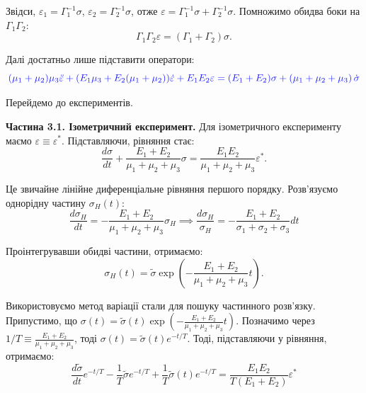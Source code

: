 \documentclass{hw_template}
\begin{document}
Звідси, $\varepsilon_1 = \Gamma_1^{-1}\sigma$, $\varepsilon_2 =
\Gamma_2^{-1}\sigma$, отже $\varepsilon = \Gamma_1^{-1}\sigma +
\Gamma_2^{-1}\sigma$. Помножимо обидва боки на $\Gamma_1\Gamma_2$:
\begin{equation*}
    \Gamma_1\Gamma_2\varepsilon = (\Gamma_1 + \Gamma_2)\sigma.
\end{equation*}

Далі достатньо лише підставити оператори:
\begin{equation*}
    \textcolor{blue!90!white}{(\mu_1+\mu_2)\mu_3\ddot{\varepsilon} + (E_1\mu_3 + E_2(\mu_1+\mu_2))\dot{\varepsilon} + E_1E_2\varepsilon = (E_1 + E_2)\sigma + \left(\mu_1+\mu_2+\mu_3\right)\dot{\sigma}}
\end{equation*}

Перейдемо до експериментів.

\textcolor{blue!90!white}{\textbf{Частина 3.1. Ізометричний експеримент.}} Для 
ізометричного експерименту маємо $\varepsilon \equiv \varepsilon^*$. Підставляючи,
рівняння стає:
\begin{equation*}
    \frac{d\sigma}{dt} + \frac{E_1 + E_2}{\mu_1+\mu_2+\mu_3}\sigma = \frac{E_1E_2}{\mu_1+\mu_2+\mu_3}\varepsilon^*.
\end{equation*}

Це звичайне лінійне диференціальне рівняння першого порядку. Розв'язуємо однорідну 
частину $\sigma_H(t)$:
\begin{equation*}
    \frac{d\sigma_H}{dt} = -\frac{E_1 + E_2}{\mu_1+\mu_2+\mu_3}\sigma _H
    \implies \frac{d\sigma_H}{\sigma_H} = -\frac{E_1 + E_2}{\sigma_1+\sigma_2+\sigma_3}dt
\end{equation*}

Проінтегрувавши обидві частини, отримаємо:
\begin{equation*}
    \sigma_H(t) = \widetilde{\sigma} \exp\left(-\frac{E_1 + E_2}{\mu_1+\mu_2+\mu_3}t\right).
\end{equation*}

Використовуємо метод варіації стали для пошуку частинного розв'язку. Припустимо,
що $\sigma(t) = \widetilde{\sigma}(t)\exp\left(-\frac{E_1 + E_2}{\mu_1+\mu_2+\mu_3}t\right)$.
Позначимо через $1/T \equiv \frac{E_1 + E_2}{\mu_1+\mu_2+\mu_3}$, тоді $\sigma(t) = \widetilde{\sigma}(t)e^{-t/T}$.
Тоді, підставляючи у рівняння, отримаємо:
\begin{equation*}
    \frac{d\widetilde{\sigma}}{dt}e^{-t/T} - \frac{1}{T}\widetilde{\sigma}e^{-t/T} + \frac{1}{T}\widetilde{\sigma}(t)e^{-t/T} = \frac{E_1E_2}{T(E_1+E_2)}\varepsilon^*
\end{equation*}
\end{document}
